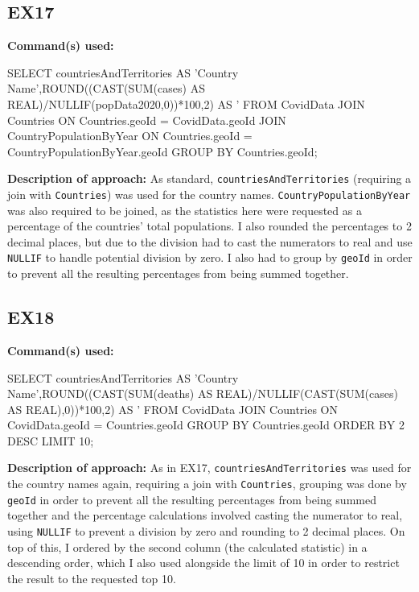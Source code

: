 \documentclass{article}
\begin{document}
\subsection{EX17}

\textbf{Command(s) used:}
\begin{spverbatim}
SELECT countriesAndTerritories AS 'Country Name',ROUND((CAST(SUM(cases) AS REAL)/NULLIF(popData2020,0))*100,2) AS '%
FROM CovidData
    JOIN Countries
        ON Countries.geoId = CovidData.geoId
    JOIN CountryPopulationByYear
        ON Countries.geoId = CountryPopulationByYear.geoId
GROUP BY Countries.geoId;
\end{spverbatim}

\textbf{Description of approach:}
As standard, \verb|countriesAndTerritories| (requiring a join with \verb|Countries|) was used for the country names. \verb|CountryPopulationByYear| was also required to be joined, as the statistics here were requested as a percentage of the countries' total populations. I also rounded the percentages to 2 decimal places, but due to the division had to cast the numerators to real and use \verb|NULLIF| to handle potential division by zero. I also had to group by \verb|geoId| in order to prevent all the resulting percentages from being summed together.

\subsection{EX18}

\textbf{Command(s) used:}
\begin{spverbatim}
SELECT countriesAndTerritories AS 'Country Name',ROUND((CAST(SUM(deaths) AS REAL)/NULLIF(CAST(SUM(cases) AS REAL),0))*100,2) AS '%
FROM CovidData
    JOIN Countries
        ON CovidData.geoId = Countries.geoId
GROUP BY Countries.geoId
ORDER BY 2 DESC
LIMIT 10;
\end{spverbatim}

\textbf{Description of approach:}
As in EX17, \verb|countriesAndTerritories| was used for the country names again, requiring a join with \verb|Countries|, grouping was done by \verb|geoId| in order to prevent all the resulting percentages from being summed together and the percentage calculations involved casting the numerator to real, using \verb|NULLIF| to prevent a division by zero and rounding to 2 decimal places. On top of this, I ordered by the second column (the calculated statistic) in a descending order, which I also used alongside the limit of 10 in order to restrict the result to the requested top 10.
\end{document}
